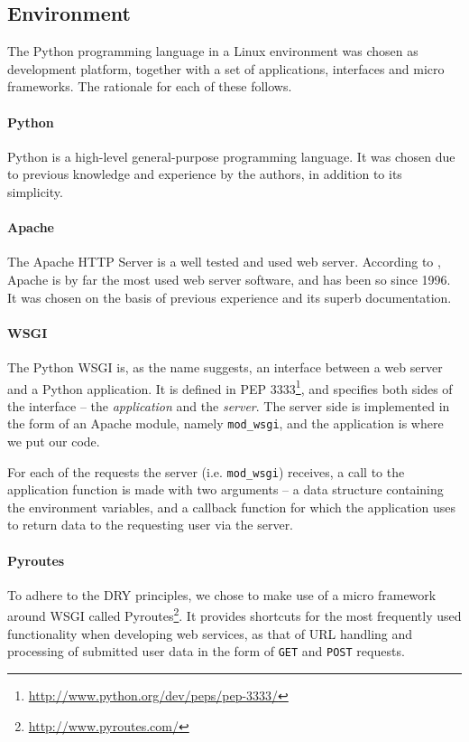\documentclass[pdftex,english,10pt,b5paper,twoside]{book}
\begin{document}
\subsection{Environment}

The Python programming language in a Linux environment was chosen as development
platform, together with a set of applications, interfaces and micro frameworks.
The rationale for each of these follows.

\paragraph{Python} Python is a high-level general-purpose programming language.
It was chosen due to previous knowledge and experience by the
authors, in addition to its simplicity.

\paragraph{Apache} The Apache HTTP Server is a well tested and used web
server. According to \citet{netcraft}, Apache is by far the most used web server
software, and has been so since 1996. It was chosen on the basis of previous
experience and its superb documentation.

\paragraph{\acs{WSGI}} The Python \ac{WSGI} is, as the name suggests, an
interface between a web server and a Python application. It is defined in
\ac{PEP} 3333\footnote{\url{http://www.python.org/dev/peps/pep-3333/}}, and
specifies both sides of the interface -- the \emph{application} and the
\emph{server}. The server side is implemented in the form of an Apache
module, namely \texttt{mod\_wsgi}, and the application is where we put our
code.

For each of the requests the server (i.e. \texttt{mod\_wsgi}) receives, a call
to the application function is made with two arguments -- a data structure
containing the environment variables, and a callback function for which the
application uses to return data to the requesting user via the server.

\paragraph{Pyroutes} To adhere to the \ac{DRY} principles, we chose to make use
of a micro framework around \ac{WSGI} called
Pyroutes\footnote{\url{http://www.pyroutes.com/}}. It provides shortcuts for the
most frequently used functionality when developing web services, as that of
\ac{URL} handling and processing of submitted user data in the form of
\texttt{GET} and \texttt{POST} requests.
\end{document}
